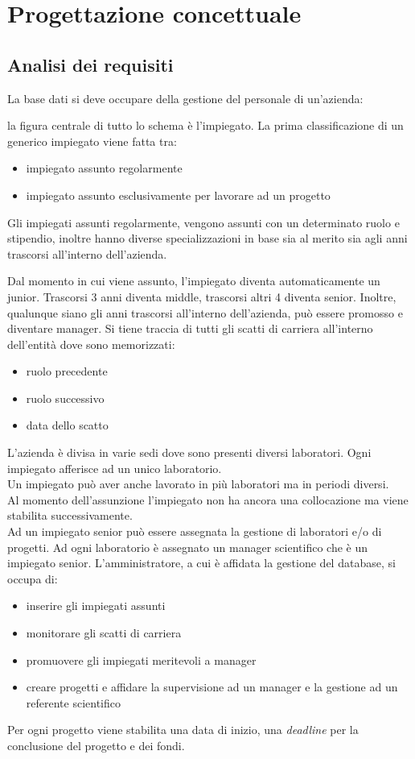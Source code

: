 \section{Progettazione concettuale}
\subsection{Analisi dei requisiti}
La base dati si deve occupare della gestione del personale di un'azienda:

la figura centrale di tutto lo schema è l'impiegato.\sskip
La prima classificazione di un generico impiegato viene fatta tra:
\begin{itemize}
	\item impiegato assunto regolarmente
	\item impiegato assunto esclusivamente per lavorare ad un progetto
\end{itemize}\medskip
Gli impiegati assunti regolarmente, vengono assunti con un determinato ruolo e stipendio, inoltre hanno diverse specializzazioni in base sia al merito sia agli anni trascorsi all'interno dell'azienda.

Dal momento in cui viene assunto, l'impiegato diventa automaticamente un junior. Trascorsi 3 anni diventa middle, trascorsi altri 4 diventa senior.
Inoltre, qualunque siano gli anni trascorsi all'interno dell'azienda, può essere promosso e diventare manager.\sskip
Si tiene traccia di tutti gli scatti di carriera all'interno dell'entità \textit{\careerlog} dove sono memorizzati:
\begin{itemize}
	\item ruolo precedente
	\item ruolo successivo
	\item data dello scatto
\end{itemize}\medskip
L'azienda è divisa in varie sedi dove sono presenti diversi laboratori.\sskip
Ogni impiegato afferisce ad un unico laboratorio.\\
Un impiegato può aver anche lavorato in più laboratori ma in periodi diversi.\\
Al momento dell'assunzione l'impiegato non ha ancora una collocazione ma viene stabilita successivamente.\\
Ad un impiegato senior può essere assegnata la gestione di laboratori e/o di progetti.\sskip
Ad ogni laboratorio è assegnato un manager scientifico che è un impiegato senior.\sskip
L'amministratore, a cui è affidata la gestione del database, si occupa di:
\begin{itemize}
	\item inserire gli impiegati assunti
	\item monitorare gli scatti di carriera
	\item promuovere gli impiegati meritevoli a manager
	\item creare progetti e affidare la supervisione ad un manager e la gestione ad un referente scientifico
\end{itemize}\smallskip
Per ogni progetto viene stabilita una data di inizio, una \textit{deadline} per la conclusione del progetto e dei fondi.

